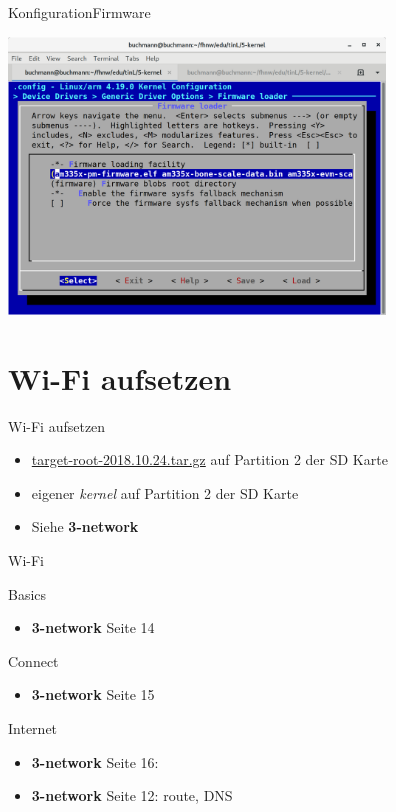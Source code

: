 \begin{frame}{Konfiguration}{Firmware}
\begin{center}
\includegraphics[width=0.75\textwidth]{firmware.png}
\end{center}
\end{frame}

\section{Wi-Fi aufsetzen}
\begin{frame}{Wi-Fi aufsetzen}
 \begin{itemize}
  \item \href{https://drive.switch.ch/index.php/s/b6kZ5n2TOIDzEiv}
        {target-root-2018.10.24.tar.gz}
        auf Partition 2 der SD Karte
  \item eigener {\em kernel} auf Partition 2 der SD Karte 
  \item Siehe {\bf 3-network} 
 \end{itemize}
\end{frame}

\begin{frame}{Wi-Fi}
 \begin{block}{Basics}
  \begin{itemize}
   \item {\bf 3-network} Seite 14
  \end{itemize}
  \end{block}
  \begin{block}{Connect}
   \begin{itemize}
    \item {\bf 3-network} Seite 15
   \end{itemize}
 \end{block}
 \begin{block}{Internet}
  \begin{itemize}
   \item {\bf 3-network} Seite 16: 
   \item {\bf 3-network} Seite 12: route, DNS
  \end{itemize}
 \end{block}
\end{frame}

